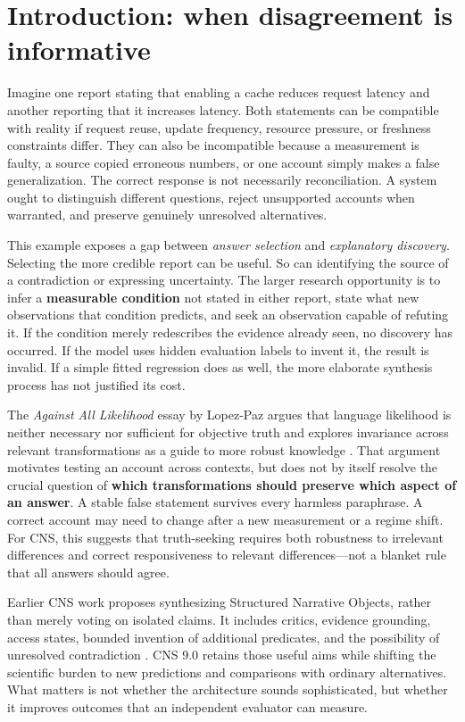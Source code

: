 \documentclass[11pt,a4paper]{article}
\begin{document}
\section{Introduction: when disagreement is
informative}\label{introduction-when-disagreement-is-informative}

Imagine one report stating that enabling a cache reduces request latency
and another reporting that it increases latency. Both statements can be
compatible with reality if request reuse, update frequency, resource
pressure, or freshness constraints differ. They can also be incompatible
because a measurement is faulty, a source copied erroneous numbers, or
one account simply makes a false generalization. The correct response is
not necessarily reconciliation. A system ought to distinguish different
questions, reject unsupported accounts when warranted, and preserve
genuinely unresolved alternatives.

This example exposes a gap between \emph{answer selection} and
\emph{explanatory discovery}. Selecting the more credible report can be
useful. So can identifying the source of a contradiction or expressing
uncertainty. The larger research opportunity is to infer a
\textbf{measurable condition} not stated in either report, state what
new observations that condition predicts, and seek an observation
capable of refuting it. If the condition merely redescribes the evidence
already seen, no discovery has occurred. If the model uses hidden
evaluation labels to invent it, the result is invalid. If a simple
fitted regression does as well, the more elaborate synthesis process has
not justified its cost.

The \emph{Against All Likelihood} essay by Lopez-Paz argues that
language likelihood is neither necessary nor sufficient for objective
truth and explores invariance across relevant transformations as a guide
to more robust knowledge \citep{R01}. That argument motivates testing an
account across contexts, but does not by itself resolve the crucial
question of \textbf{which transformations should preserve which aspect
of an answer}. A stable false statement survives every harmless
paraphrase. A correct account may need to change after a new measurement
or a regime shift. For CNS, this suggests that truth-seeking requires
both robustness to irrelevant differences and correct responsiveness to
relevant differences---not a blanket rule that all answers should agree.

Earlier CNS work proposes synthesizing Structured Narrative Objects,
rather than merely voting on isolated claims. It includes critics,
evidence grounding, access states, bounded invention of additional
predicates, and the possibility of unresolved contradiction
\citep{G02, G03, G11}. CNS 9.0 retains those useful aims while shifting
the scientific burden to new predictions and comparisons with ordinary
alternatives. What matters is not whether the architecture sounds
sophisticated, but whether it improves outcomes that an independent
evaluator can measure.
\end{document}
